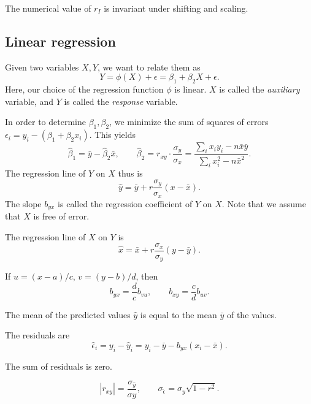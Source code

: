 \documentclass[11pt]{article}
\theoremstyle{definition}
\theoremstyle{remark}
\numberwithin{equation}{section}
\begin{document}
    \begin{lemma}
        The numerical value of $r_I$ is invariant under shifting and scaling.
    \end{lemma}
    


    \subsection{Linear regression}
    
    Given two variables $X, Y$, we want to relate them as \[
        Y = \phi(X) + \epsilon = \beta_1 + \beta_2X + \epsilon.
    \] Here, our choice of the regression function $\phi$ is linear. $X$ is called
    the \emph{auxiliary} variable, and $Y$ is called the \emph{response} variable.

    In order to determine $\beta_1, \beta_2$, we minimize the sum of squares of
    errors $\epsilon_i = y_i - (\beta_1 + \beta_2x_i)$. This yields \[
        \hat{\beta}_1 = \bar{y} - \hat{\beta}_2\bar{x}, \qquad
        \hat{\beta}_2 = r_{xy} \cdot \frac{\sigma_y}{\sigma_x} = \frac{\sum_i x_iy_i
        - n\bar{x}\bar{y}}{\sum_i x_i^2 - n\bar{x}^2}.
    \] The regression line of $Y$ on $X$ thus is \[
        \hat{y} = \bar{y} + r\frac{\sigma_y}{\sigma_x}(x - \bar{x}).
    \] The slope $b_{yx}$ is called the regression coefficient of $Y$ on $X$. Note
    that we assume that $X$ is free of error.

    The regression line of $X$ on $Y$ is \[
        \hat{x} = \bar{x} + r\frac{\sigma_x}{\sigma_y}(y - \bar{y}).
    \] 

    \begin{lemma}
        If $u = (x - a) / c$, $v = (y - b) / d$, then \[
            b_{yx} = \frac{d}{c}b_{vu}, \qquad
            b_{xy} = \frac{c}{d}b_{uv}.
        \] 
    \end{lemma}

    \begin{lemma}
        The mean of the predicted values $\hat{y}$ is equal to the mean $\bar{y}$ of
        the values.
    \end{lemma}

    The residuals are \[
        \hat{\epsilon}_i = y_i - \hat{y}_i = y_i - \bar{y} - b_{yx}(x_i - \bar{x}).
    \] 

    \begin{lemma}
        The sum of residuals is zero.
    \end{lemma}

    \begin{lemma}
        \[
            |r_{xy}| = \frac{\sigma_{\hat{y}}}{\sigma{y}}, \qquad
            \sigma_{\hat{\epsilon}} = \sigma_y\sqrt{1 - r^2}.
        \] 
    \end{lemma}
\end{document}
